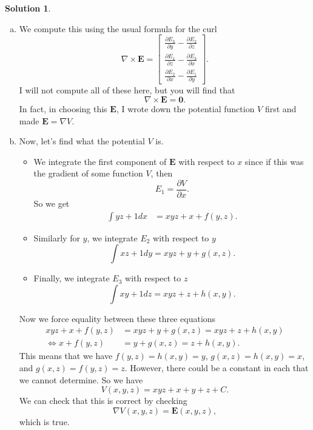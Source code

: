 \documentclass[12pt]{report} %
\theoremstyle{definition}
\newtheorem{solution}{Solution}
\begin{document}
\begin{solution}
\begin{enumerate}[(a)]
    \item We compute this using the usual formula for the curl
    \[
    \nabla \times \mathbf{E} = \begin{bmatrix} \frac{\partial E_3}{\partial y} - \frac{\partial E_2}{\partial z} \\ \frac{\partial E_1}{\partial z} - \frac{\partial E_3}{\partial x} \\ \frac{\partial E_2}{\partial x} - \frac{\partial E_1}{\partial y} \end{bmatrix}.
    \]
    I will not compute all of these here, but you will find that
    \[
    \nabla \times \mathbf{E}=\mathbf{0}.
    \]
    In fact, in choosing this $\mathbf{E}$, I wrote down the potential function $V$ first and made $\mathbf{E}=\nabla V$.
    \item Now, let's find what the potential $V$ is.  
    \begin{itemize}
        \item We integrate the first component of $\mathbf{E}$ with respect to $x$ since if this was the gradient of some function $V$, then 
        \[
        E_1 = \frac{\partial V}{\partial x}.
        \]
        So we get
        \begin{align*}
            \int yz+1 dx &= xyz+x + f(y,z).
        \end{align*}
        \item Similarly for $y$, we integrate $E_2$ with respect to $y$
        \[
        \int xz+1 dy = xyz + y + g(x,z).
        \]
        \item Finally, we integrate $E_3$ with respect to $z$
        \[
        \int xy+1 dz = xyz + z + h(x,y).
        \]
    \end{itemize}
    Now we force equality between these three equations
    \begin{align*}
    xyz+x+f(y,z)&=xyz+y+g(x,z)=xyz+z+h(x,y)\\
    \iff x+f(y,z)&=y+g(x,z)=z+h(x,y).
    \end{align*}
    This means that we have $f(y,z)=h(x,y)=y$, $g(x,z)=h(x,y)=x$, and $g(x,z)=f(y,z)=z$.  However, there could be a constant in each that we cannot determine.  So we have
    \[
    V(x,y,z)=xyz+x+y+z+C.
    \]
    We can check that this is correct by checking
    \[
    \nabla V(x,y,z)=\mathbf{E}(x,y,z),
    \]
    which is true.
\end{enumerate}

\end{solution}
\end{document}
